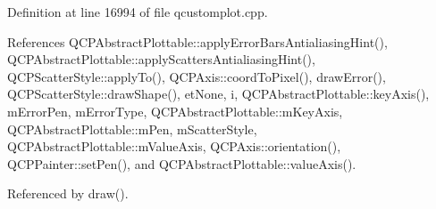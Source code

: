 Definition at line 16994 of file qcustomplot.\+cpp.



References Q\+C\+P\+Abstract\+Plottable\+::apply\+Error\+Bars\+Antialiasing\+Hint(), Q\+C\+P\+Abstract\+Plottable\+::apply\+Scatters\+Antialiasing\+Hint(), Q\+C\+P\+Scatter\+Style\+::apply\+To(), Q\+C\+P\+Axis\+::coord\+To\+Pixel(), draw\+Error(), Q\+C\+P\+Scatter\+Style\+::draw\+Shape(), et\+None, i, Q\+C\+P\+Abstract\+Plottable\+::key\+Axis(), m\+Error\+Pen, m\+Error\+Type, Q\+C\+P\+Abstract\+Plottable\+::m\+Key\+Axis, Q\+C\+P\+Abstract\+Plottable\+::m\+Pen, m\+Scatter\+Style, Q\+C\+P\+Abstract\+Plottable\+::m\+Value\+Axis, Q\+C\+P\+Axis\+::orientation(), Q\+C\+P\+Painter\+::set\+Pen(), and Q\+C\+P\+Abstract\+Plottable\+::value\+Axis().



Referenced by draw().


